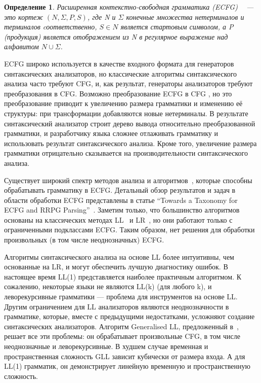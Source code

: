 \documentclass[14pt]{matmex-diploma-custom}
\newtheorem{mydef}{Определение}
\begin{document}
	\begin{mydef}
		Расширенная контекстно-свободная грамматика \newline(ECFG) ~\cite{ECFG} --- это кортеж $(N, \Sigma, P, S)$,
		где N и $\Sigma$ конечные множества нетерминалов и терминалов cоответственно, 
		$S\in N$ является стартовым символом, а P (продукция) является отображением из N в
		регулярное выражение над алфавитом $N \cup \Sigma$.
		
	\end{mydef}
	ECFG широко используется в качестве входного формата для генераторов синтаксических анализаторов, 
	но классические алгоритмы синтаксического анализа часто требуют CFG, и, 
	как результат, генераторы анализаторов требуют преобразования в CFG. 
	Возможно преобразование ECFG в CFG \cite{ELL}, но это преобразование приводит к увеличению
	размера грамматики и изменению её структуры: при трансформации добавляются новые
	нетерминалы. В результате синтаксический анализатор строит дерево вывода относительно
	преобразованной грамматики, и разработчику языка сложнее отлаживать грамматику 
	и использовать результат синтаксического анализа. Кроме того, увеличение размера грамматики 
    отрицательно сказывается на производительности синтаксического анализа.
    
	Существует широкий спектр методов анализа и алгоритмов~\cite{AttributedELL,ELRR,
		ECFGparsing,ELLParser,ELL,ECFG,ELALR,ELRParsing}, которые способны обрабатывать 
	грамматику в ECFG. Детальный обзор результатов и задач в области обработки ECFG 
	представлены в статье ``Towards a Taxonomy for ECFG and RRPG Parsing''~\cite{ECFG}.
	Заметим только, что большинство алгоритмов основаны на классических методах
	LL~\cite{ELLParser,AttributedELL,PredictiveECFG} и LR~\cite{ELRParsing,ELALR,ELRR},
	но они работают только с ограниченными подклассами ECFG. Таким образом, нет решения 
	для обработки произвольных (в том числе неоднозначных) ECFG.
	
	Алгоритмы синтаксического анализа на основе LL более интуитивны, чем основанные на LR, и могут
	обеспечить лучшую диагностику ошибок. В настоящее время LL(1) представляется
	наиболее практичным алгоритмом. К сожалению, некоторые языки не являются LL(k) (для любого k),
	и леворекурсивные грамматики --- проблема для инструментов на основе LL. 
	Другим ограничением для LL анализаторов являются неоднозначности в грамматике, 
	которые, вместе с предыдущими недостатками, усложняют создание синтаксических 
	анализаторов. Алгоритм Generalised LL, предложенный в~\cite{scott2010gll}, решает 
	все эти проблемы: он обрабатывает произвольные CFG, в том числе неоднозначные и
	леворекурсивные.
	В худшем случае временная и пространственная сложность GLL зависит кубически от 
	размера входа. А для LL(1) грамматик, он демонстрирует линейную временную и
	пространственную сложность.
    
\end{document}
